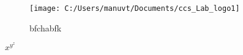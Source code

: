 \documentclass[]{article}
\begin{document}
\begin{figure}

\begin{flushleft}
		\texttt{[image: C:/Users/manuvt/Documents/ccs\_Lab\_logo1]}
\end{flushleft}
	\caption{bfchabfk}
	\label{fig:ccslablogo1}
\end{figure}



$x^{y^{z}}$
\end{document}
